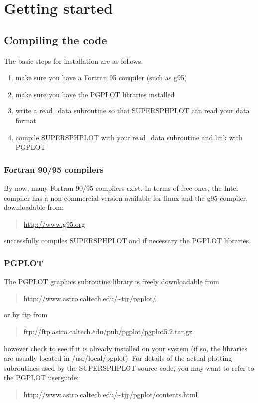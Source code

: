 \documentclass[a4paper,11pt]{article}
\begin{document}
\section{Getting started}
\subsection{Compiling the code}
The basic steps for installation are as follows:
\begin{enumerate}
\item make sure you have a Fortran 95 compiler (such as g95)
\item make sure you have the PGPLOT libraries installed
\item write a read\_data subroutine so that SUPERSPHPLOT can read your data format
\item compile SUPERSPHPLOT with your read\_data subroutine and link with PGPLOT
\end{enumerate}

\subsubsection{Fortran 90/95 compilers}
 By now, many Fortran 90/95 compilers exist. In terms of free ones, the Intel compiler has a
 non-commercial version available for linux and the
g95 compiler, downloadable from:
\begin{quote}
\url{http://www.g95.org}
\end{quote}
successfully compiles SUPERSPHPLOT and if necessary the PGPLOT libraries.

\subsubsection{PGPLOT}
 The PGPLOT
graphics subroutine library is freely downloadable from
\begin{quote}
\url{http://www.astro.caltech.edu/~tjp/pgplot/}
\end{quote}
or by ftp from
\begin{quote}
\url{ftp://ftp.astro.caltech.edu/pub/pgplot/pgplot5.2.tar.gz}
\end{quote}
however check to see if it is already installed on your system (if so, the libraries are
usually located in /usr/local/pgplot). For details of the actual plotting subroutines
used by the SUPERSPHPLOT source code, you may want to refer to the PGPLOT userguide:
\begin{quote}
\url{http://www.astro.caltech.edu/~tjp/pgplot/contents.html}
\end{quote}
\end{document}
